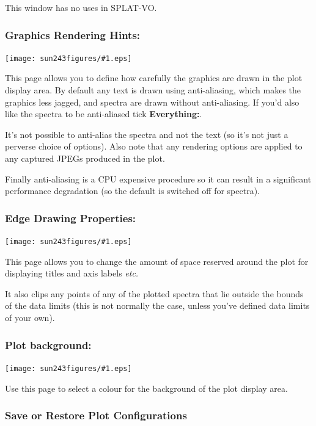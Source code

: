\documentclass[twoside,11pt]{article}
\newcommand{\htmladdimg}[1]{}
\newcommand{\latexhtml}[2]{#1}
\renewcommand{\_}{\texttt{\symbol{95}}}
\newcommand{\SPLAT}{\textsf{SPLAT-VO}}
\newcommand{\mainfigure}[1]
{\begin{center}
 \latexhtml{\texttt{[image: sun243\_figures/\#1.eps]}}{\htmladdimg{#1.gif}}
 \end{center}
}
\newcommand{\labelitem}[1]{\textbf{#1}}
\newcommand{\etc}{\textit{etc.}}
\begin{document}
This window has no uses in \SPLAT.

\newpage
\subsubsection*{Graphics Rendering Hints:}

\mainfigure{configurewindowrender}

This page allows you to define how carefully the graphics are drawn in the
plot display area. By default any text is drawn using anti-aliasing, which
makes the graphics less jagged, and spectra are drawn without
anti-aliasing. If you'd also like the spectra to be anti-aliased tick
\labelitem{Everything:}.

It's not possible to anti-alias the spectra and not the text (so it's
not just a perverse choice of options). Also note that any rendering
options are applied to any captured JPEGs produced in the plot.

Finally anti-aliasing is a CPU expensive procedure so it can result in
a significant performance degradation (so the default is switched off
for spectra).

\newpage
\subsubsection*{Edge Drawing Properties:}

\mainfigure{configurewindowedges}

This page allows you to change the amount of space reserved around the
plot for displaying titles and axis labels \etc\

It also clips any points of any of the plotted spectra that lie
outside the bounds of the data limits (this is not normally the case,
unless you've defined data limits of your own).

\newpage
\subsubsection*{Plot background:}

\mainfigure{configurewindowbackground}

Use this page to select a colour for the background of the plot
display area.

\newpage
\subsubsection*{Save or Restore Plot Configurations}
\end{document}
